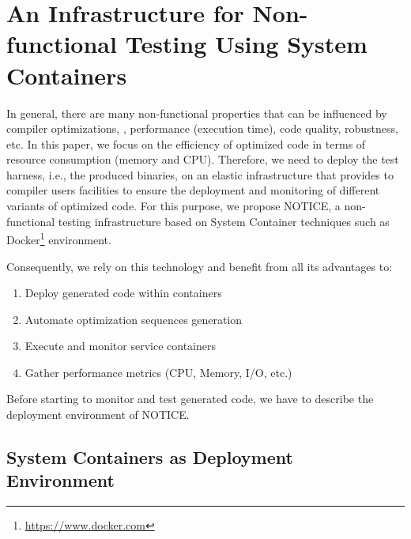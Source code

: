 \section{An Infrastructure for Non-functional Testing Using System Containers}
In general, there are many non-functional properties that can be influenced by compiler optimizations, \eg, performance (execution time), code quality, robustness, etc. In this paper, we focus on the efficiency of optimized code in terms of resource consumption (memory and CPU).
Therefore, we need to deploy the test harness, i.e., the produced binaries, on an elastic infrastructure that provides to compiler users facilities to ensure the deployment and monitoring of different variants of optimized code. 
For this purpose, we propose NOTICE, a non-functional testing infrastructure based on System Container techniques such as Docker\footnote{\url{https://www.docker.com}} environment. 

Consequently, we rely on this technology and benefit from all its advantages to:
\begin{enumerate}
	\item Deploy generated code within containers
	\item Automate optimization sequences generation
	\item Execute and monitor service containers
	\item Gather performance metrics (CPU, Memory, I/O, etc.)
\end{enumerate}


Before starting to monitor and test generated code, we have to describe the deployment environment of NOTICE.
\subsection{System Containers as Deployment Environment}

